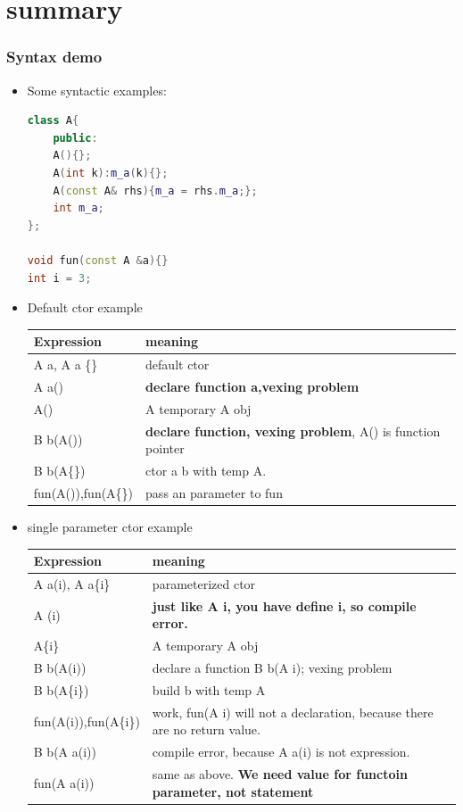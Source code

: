 \documentclass[a4paper,12pt,twoside]{book}
\begin{document}
\section{summary}

\subsubsection{Syntax demo}
\begin{itemize}
	
	\item Some syntactic examples: \newline
\begin{lstlisting}[frame=single, language=c++]
class A{
	public:
	A(){};
	A(int k):m_a(k){};
	A(const A& rhs){m_a = rhs.m_a;};
	int m_a;
};
	
void fun(const A &a){}
int i = 3;
\end{lstlisting}
	
	\item Default ctor example \newline
	\begin{tabular}{|p{}|p{}|}
		\hline
		Expression & meaning \\
		\hline
		A a, A a \{\} & default ctor \\
		\hline
		A a() & \textbf{declare function a,vexing problem} \\
		\hline
		A() & A temporary A obj\\
		\hline
		B b(A()) & \textbf{declare function, vexing problem}, A() is function pointer \\
		\hline
		B b(A\{\}) & ctor a b with temp A. \\
		\hline
		fun(A()),fun(A\{\}) & pass an parameter to fun\\
		\hline
	\end{tabular}
	\item single parameter ctor example \newline
	
	\begin{tabular}{|p{}|p{}|}
		\hline
		Expression & meaning \\
		\hline
		A a(i), A a\{i\} & parameterized ctor\\
		\hline
		A (i) & \textbf{just like A i, you have define i, so compile error.} \\
		\hline
		A\{i\} & A temporary A obj\\
		\hline
		B b(A(i)) & declare a function B b(A i); vexing problem \\
		\hline
		B b(A\{i\}) & build b with temp A\\
		\hline
		fun(A(i)),fun(A\{i\}) & work, fun(A i) will not a declaration, because there are no return value.\\
		\hline
		B b(A a(i))  & compile error, because A a(i) is not expression. \\
		\hline
		fun(A a(i)) & same as above. \textbf{We need value for functoin parameter, not statement} \\
		\hline
	\end{tabular}
	

\end{itemize}
\end{document}
